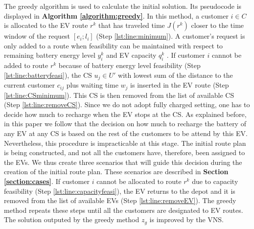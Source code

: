 \documentclass[11pt]{article}
\begin{document}
The greedy algorithm is used to calculate the initial solution. Its pseudocode is displayed in \textbf{Algorithm \ref{algorithm:greedy}}. In this method, a customer $i \in C$ is allocated to the EV route $r^k$ that has traveled time $J(r^k)$ closer to the time window of the request $[e_i;l_i]$ (Step \ref{lst:line:minimum}). A customer's request is only added to a route when feasibility can be maintained with respect to remaining battery energy level $y^k_i$ and EV capacity $q^k_i$ . If customer $i$ cannot be added to route $r^k$ because of battery energy level feasibility (Step \ref{lst:line:batteryfeasi}), the CS $u_j \in U'$ with lowest sum of the distance to the current customer $c_{ij}$ plus waiting time $w_j$ is inserted in the EV route (Step \ref{lst:line:CSminimum}). This CS is then removed from the list of available CS (Step \ref{lst:line:removeCS}). Since we do not adopt fully charged setting, one has to decide how much to recharge when the EV stops at the CS. As explained before, in this paper we follow that the decision on how much to recharge the battery of any EV at any CS is based on the rest of the customers to be attend by this EV. Nevertheless, this procedure is impracticable at this stage. The initial route plan is being constructed, and not all the customers have, therefore, been assigned to the EVs. We thus create three scenarios that will guide this decision during the creation of the initial route plan. These scenarios are described in \textbf{Section \ref{section:cases}}. If customer $i$ cannot be allocated to route $r^k$ due to capacity feasibility (Step \ref{lst:line:capacityfeasi}), the EV returns to the depot and it is removed from the list of available EVs (Step \ref{lst:line:removeEV}). The greedy method repeats these steps until all the customers are designated to EV routes. The solution outputed by the greedy method $z_g$ is improved by the VNS. 
\end{document}

